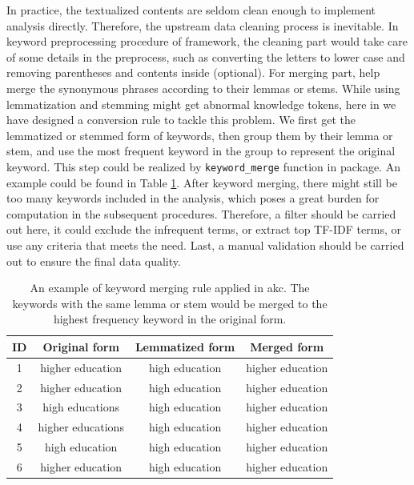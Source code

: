 In practice, the textualized contents are seldom clean enough to implement analysis directly. Therefore, the upstream data cleaning process is inevitable. In keyword preprocessing procedure of  framework, the cleaning part would take care of some details in the preprocess, such as converting the letters to lower case and removing parentheses and contents inside (optional). For merging part,  help merge the synonymous phrases according to their lemmas or stems. While using lemmatization and stemming might get abnormal knowledge tokens, here in  we have designed a conversion rule to tackle this problem. We first get the lemmatized or stemmed form of keywords, then group them by their lemma or stem, and use the most frequent keyword in the group to represent the original keyword. This step could be realized by \texttt{keyword\_merge} function in  package. An example could be found in Table \ref{tab:tab1-2}. After keyword merging, there might still be too many keywords included in the analysis, which poses a great burden for computation in the subsequent procedures. Therefore, a filter should be carried out here, it could exclude the infrequent terms, or extract top TF-IDF terms, or use any criteria that meets the need. Last, a manual validation should be carried out to ensure the final data quality.

\begin{table}

\caption{\label{tab:tab1-2}An example of keyword merging rule applied in akc. The keywords with the same lemma or stem would be merged to the highest frequency keyword in the original form.}
\centering
\fontsize{7}{9}\selectfont
\begin{tabular}[t]{c|c|c|c}
\hline
ID & Original form & Lemmatized form & Merged form\\
\hline
1 & higher education & high education & higher education\\
\hline
2 & higher education & high education & higher education\\
\hline
3 & high educations & high education & higher education\\
\hline
4 & higher educations & high education & higher education\\
\hline
5 & high education & high education & higher education\\
\hline
6 & higher education & high education & higher education\\
\hline
\end{tabular}
\end{table}

